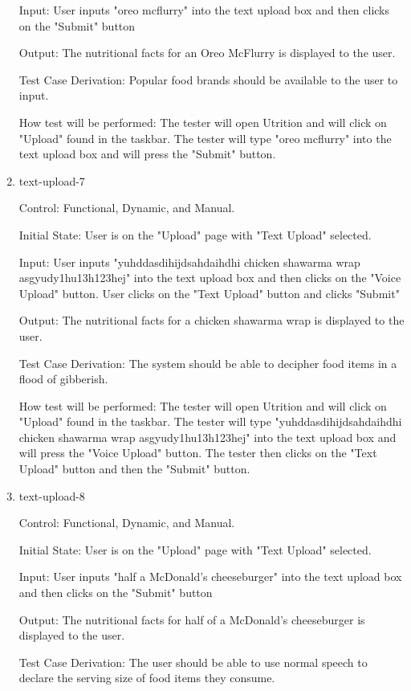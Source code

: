 \documentclass[12pt, titlepage]{article}
\begin{document}
\begin{enumerate}
	Input: User inputs "oreo mcflurry" into the text upload box and then clicks on the "Submit" button
	
	Output: The nutritional facts for an Oreo McFlurry is displayed to the user.
	
	Test Case Derivation: Popular food brands should be available to the user to input.
	
	How test will be performed: The tester will open Utrition and will click on "Upload" found in the taskbar. The tester will type "oreo mcflurry" into the text upload box and will press the "Submit" button.
	
	\item{text-upload-7\\}
	
	Control: Functional, Dynamic, and Manual.
	
	Initial State: User is on the "Upload" page with "Text Upload" selected.
	
	Input: User inputs "yuhddasdihijdsahdaihdhi chicken shawarma wrap asgyudy1hu13h123hej" into the text upload box and then clicks on the "Voice Upload" button. User clicks on the "Text Upload" button and clicks "Submit"
	
	Output: The nutritional facts for a chicken shawarma wrap is displayed to the user.
	
	Test Case Derivation: The system should be able to decipher food items in a flood of gibberish.
	
	How test will be performed: The tester will open Utrition and will click on "Upload" found in the taskbar. The tester will type "yuhddasdihijdsahdaihdhi chicken shawarma wrap asgyudy1hu13h123hej" into the text upload box and will press the "Voice Upload" button. The tester then clicks on the "Text Upload" button and then the "Submit" button.
	
	\item{text-upload-8\\}
	
	Control: Functional, Dynamic, and Manual.
	
	Initial State: User is on the "Upload" page with "Text Upload" selected.
	
	Input: User inputs "half a McDonald's cheeseburger" into the text upload box and then clicks on the "Submit" button
	
	Output: The nutritional facts for half of a McDonald's cheeseburger is displayed to the user.
	
	Test Case Derivation: The user should be able to use normal speech to declare the serving size of food items they consume.
	

\end{enumerate}
\end{document}
